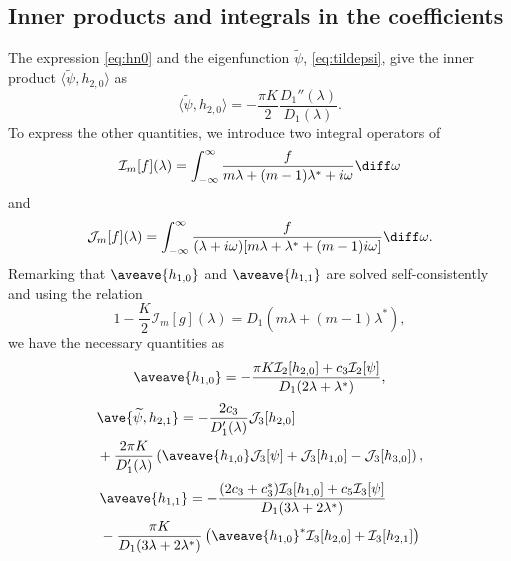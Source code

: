 \subsection{Inner products and integrals in the coefficients}
The expression \eqref{eq:hn0} and the eigenfunction $\widetilde{\psi}$,
\eqref{eq:tildepsi}, give the inner product
$\langle\widetilde{\psi},h_{2,0}\rangle$ as
\begin{equation}
  \langle\widetilde{\psi},h_{2,0}\rangle
  = - \dfrac{\pi K}{2} \dfrac{D_{1}''(\lambda)}{D_{1}(\lambda)}.
\end{equation}
To express the other quantities, we introduce two integral operators of
\begin{equation}
  \mathcal{I}_{m}[f](\lambda) = \int_{-\infty}^{\infty} \dfrac{f}{m\lambda+(m-1)\lambda^{\ast}+i\omega} \diff\omega
\end{equation}
and
\begin{equation}
  \mathcal{J}_{m}[f](\lambda) = \int_{-\infty}^{\infty} \dfrac{f}{(\lambda+i\omega)[m\lambda+\lambda^{\ast}+(m-1)i\omega]} \diff\omega.
\end{equation}
Remarking that $\aveave{h_{1,0}}$ and $\aveave{h_{1,1}}$ are solved
self-consistently and using the relation
\begin{equation}
  1 - \dfrac{K}{2} \mathcal{I}_{m}[g](\lambda)
  =  D_{1}(m\lambda+(m-1)\lambda^{\ast}),
\end{equation}
we have the necessary quantities as
\begin{equation}
  \aveave{h_{1,0}} = - \dfrac{\pi K \mathcal{I}_{2}[h_{2,0}] + c_{3}\mathcal{I}_{2}[\psi]}{D_{1}(2\lambda+\lambda^{\ast})},
\end{equation}
\begin{equation}
  \begin{split}
    & \ave{\widetilde{\psi}, h_{2,1}}
    = - \dfrac{2c_{3}}{D_{1}'(\lambda)} \mathcal{J}_{3}[h_{2,0}] \\
    & + \dfrac{2\pi K}{D_{1}'(\lambda)} \left(
      \aveave{h_{1,0}} \mathcal{J}_{3}[\psi]
      + \mathcal{J}_{3}[h_{1,0}]
      - \mathcal{J}_{3}[h_{3,0}] \right),
  \end{split}
\end{equation}
\begin{equation}
  \begin{split}
    & \aveave{h_{1,1}}
    = - \dfrac{(2c_{3}+c_{3}^{\ast}) \mathcal{I}_{3}[h_{1,0}] + c_{5} \mathcal{I}_{3}[\psi]}{D_{1}(3\lambda+2\lambda^{\ast})} \\
    & - \dfrac{\pi K}{D_{1}(3\lambda+2\lambda^{\ast})}
    \left( \aveave{h_{1,0}}^{\ast} \mathcal{I}_{3}[h_{2,0}]
      + \mathcal{I}_{3}[h_{2,1}] \right) \\
  \end{split}
\end{equation}
